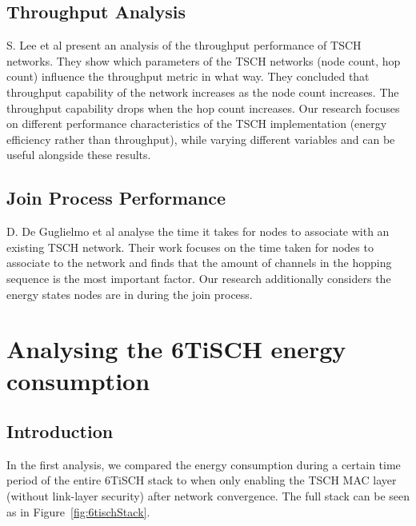 \documentclass[conference]{IEEEtran}
\newcommand{\figref}[1]{Figure~\ref{#1}}
\renewcommand\_{\textunderscore\allowbreak}
\begin{document}
\subsection{Throughput Analysis} S. Lee et al present an analysis of the throughput performance of TSCH networks. They show which parameters of the TSCH networks (node count, hop count) influence the throughput metric in what way. They concluded that throughput capability of the network increases as the node count increases. The throughput capability drops when the hop count increases. Our research focuses on different performance characteristics of the TSCH implementation (energy efficiency rather than throughput), while varying different variables and can be useful alongside these results\cite{ThroughputEvaluation}. 
\subsection{Join Process Performance} D. De Guglielmo et al analyse the time it takes for nodes to associate with an existing TSCH network. Their work focuses on the time taken for nodes to associate to the network and finds that the amount of channels in the hopping sequence is the most important factor\cite{JoinProcess}. Our research additionally considers the energy states nodes are in during the join process. 

\section{Analysing the 6TiSCH energy consumption}
\label{section:task1}

\subsection{Introduction} 
\label{section:t1_intro}
In the first analysis, we compared the energy consumption during a certain time period of the entire 6TiSCH stack to when only enabling the TSCH MAC layer (without link-layer security) after network convergence.
The full stack can be seen as in \figref{fig:6tischStack}.
\end{document}
